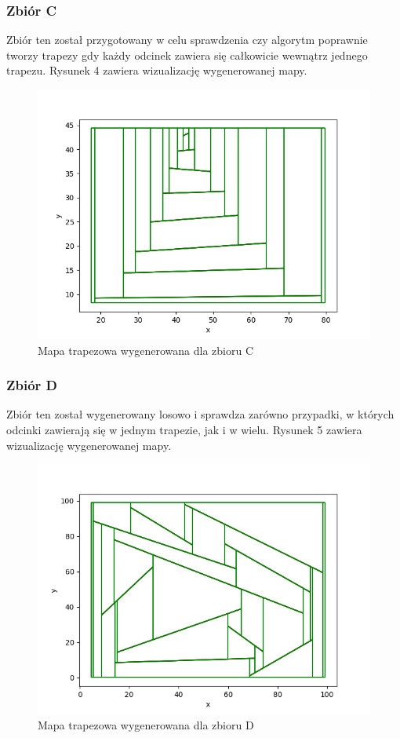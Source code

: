 \documentclass[11pt,a4paper]{article}
\begin{document}
\subsubsection{Zbiór C}
Zbiór ten został przygotowany w celu sprawdzenia
czy algorytm poprawnie tworzy trapezy gdy każdy
odcinek zawiera się całkowicie wewnątrz jednego
trapezu. Rysunek 4 zawiera wizualizację wygenerowanej mapy.

\begin{figure}[H]
    \centering
    \includegraphics[scale=0.46]{./res/figs/test_c_map.png}
    \caption{Mapa trapezowa wygenerowana dla zbioru C}
\end{figure}

\pagebreak

\subsubsection{Zbiór D}
Zbiór ten został wygenerowany losowo i sprawdza
zarówno przypadki, w których odcinki zawierają się
w jednym trapezie, jak i w wielu. Rysunek 5
zawiera wizualizację wygenerowanej mapy.

\begin{figure}[H]
    \centering
    \includegraphics[scale=0.5]{./res/figs/test_d_map.png}
    \caption{Mapa trapezowa wygenerowana dla zbioru D}
\end{figure}
\end{document}
